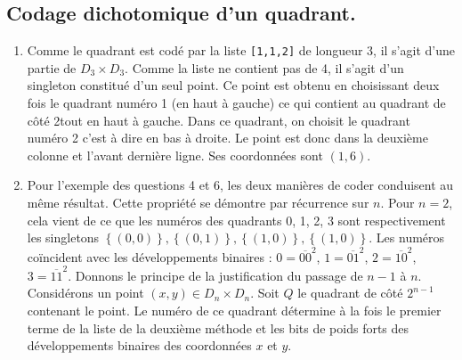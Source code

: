 \subsection{Codage dichotomique d'un quadrant.}
\begin{enumerate}[resume]
 \item Comme le quadrant est codé par la liste \texttt{[1,1,2]} de longueur 3, il s'agit d'une partie de $D_3 \times D_3$. Comme la liste ne contient pas de 4, il s'agit d'un singleton constitué d'un seul point. Ce point est obtenu en choisissant deux fois le quadrant numéro 1 (en haut à gauche) ce qui contient au quadrant de côté 2tout en haut à gauche. Dans ce quadrant, on choisit le quadrant numéro 2 c'est à dire en bas à droite. Le point est donc dans la deuxième colonne et l'avant dernière ligne. Ses coordonnées sont $(1,6)$.
 
 \item Pour l'exemple des questions 4 et 6, les deux manières de coder conduisent au même résultat. Cette propriété se démontre par récurrence sur $n$.\newline
 Pour $n = 2$, cela vient de ce que les numéros des quadrants 0, 1, 2, 3 sont respectivement les singletons $\left\lbrace (0,0)\right\rbrace, \left\lbrace (0,1)\right\rbrace, \left\lbrace (1,0)\right\rbrace, \left\lbrace (1,0)\right\rbrace$. Les numéros coïncident avec les développements binaires : $0 = \overline{00}^2$, $1 = \overline{01}^2$, $2 = \overline{10}^2$, $3 = \overline{11}^2$.\newline
 Donnons le principe de la justification du passage de $n-1$ à $n$. Considérons un point $(x,y) \in D_n\times D_n$. Soit $Q$ le quadrant de côté $2^{n-1}$ contenant le point. Le numéro de ce quadrant détermine à la fois le premier terme de la liste de la deuxième méthode et les bits de poids forts des développements binaires des coordonnées $x$ et $y$.
\end{enumerate}


